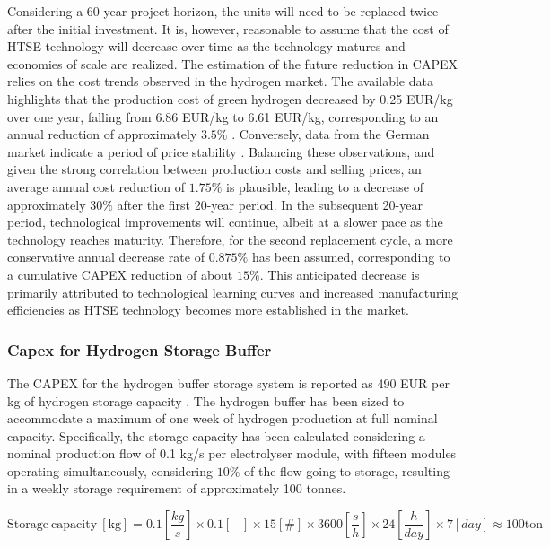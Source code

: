 Considering a 60-year project horizon, the units will need to be replaced twice after the initial investment. It is, however, reasonable to assume that the cost of HTSE technology will decrease over time as the technology matures and economies of scale are realized. The estimation of the future reduction in CAPEX relies on the cost trends observed in the hydrogen market. The available data highlights that the production cost of green hydrogen decreased by 0.25 EUR/kg over one year, falling from 6.86 EUR/kg to 6.61 EUR/kg, corresponding to an annual reduction of approximately $3.5\%$ \cite{HydrogenMarket2024}. Conversely, data from the German market indicate a period of price stability \cite{EEX2025}. Balancing these observations, and given the strong correlation between production costs and selling prices, an average annual cost reduction of $1.75\%$ is plausible, leading to a decrease of approximately $30\%$ after the first 20-year period. In the subsequent 20-year period, technological improvements will continue, albeit at a slower pace as the technology reaches maturity. Therefore, for the second replacement cycle, a more conservative annual decrease rate of $0.875\%$ has been assumed, corresponding to a cumulative CAPEX reduction of about $15\%$. This anticipated decrease is primarily attributed to technological learning curves and increased manufacturing efficiencies as HTSE technology becomes more established in the market.

\subsubsection {Capex for Hydrogen Storage Buffer}
The CAPEX for the hydrogen buffer storage system is reported as 490 EUR per kg of hydrogen storage capacity \cite{TANDEM2023}. The hydrogen buffer has been sized to accommodate a maximum of one week of hydrogen production at full nominal capacity. Specifically, the storage capacity has been calculated considering a nominal production flow of 0.1 kg/s per electrolyser module, with fifteen modules operating simultaneously, considering $10\%$ of the flow going to storage, resulting in a weekly storage requirement of approximately 100 tonnes.

\begin{equation}
    \mathrm{Storage\ capacity\ [kg]} = 0.1 \left[ \frac{kg}{s}\right] \times 0.1 \left[ - \right] \times 15 \left[ \# \right] \times 3600 \left[ \frac{s}{h}\right] \times 24 \left[ \frac{h}{day}\right] \times 7 \left[ day\right] \approx 100 \text{ton}
\end{equation}

